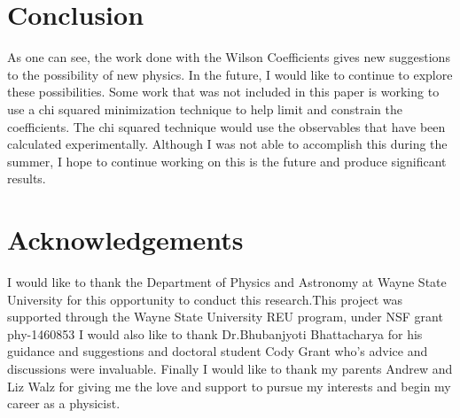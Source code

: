 \documentclass[12pt]{article}
\begin{document}
\section{Conclusion}
As one can see, the work done with the Wilson Coefficients gives new suggestions to the possibility of new physics. In the future, I would like to continue to explore these possibilities. Some work that was not included in this paper is working to use a chi squared minimization technique to help limit and constrain the coefficients. The chi squared technique would use the observables that have been calculated experimentally. Although I was not able to accomplish this during the summer, I hope to continue working on this is the future and produce significant results.
\section{Acknowledgements}
I would like to thank the Department of Physics and Astronomy at Wayne State University for this opportunity to conduct this research.This project was supported through the Wayne State University REU program, under NSF grant phy-1460853 I would also like to thank Dr.Bhubanjyoti Bhattacharya for his guidance and suggestions and doctoral student Cody Grant who's advice and discussions were invaluable. Finally I would like to thank my parents Andrew and Liz Walz for giving me the love and support to pursue my interests and begin my career as a physicist.  
\newpage
\end{document}
